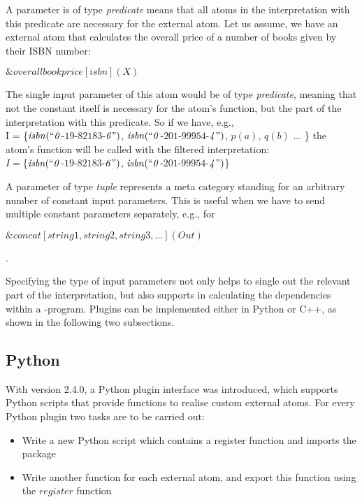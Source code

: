 \documentclass[a4paper, titlepage]{article}
\newcommand{\ext}[3]{\ensuremath{\&{#1}[#2](#3)}}
\newcommand\mycenterline[1]{\par\smallskip\centerline{#1} \smallskip}
\begin{document}
A parameter is of type \emph{predicate} means that 
all atoms in the interpretation with this predicate are 
necessary for the external atom. Let us assume, we have an external 
atom that calculates the overall price of a number of books 
given by their ISBN number:
\mycenterline{$\ext{overallbookprice}{isbn}{X}$}
The single input parameter of this atom would be of type 
\emph{predicate}, meaning that not the constant itself is 
necessary for the atom's function, but the part of the 
interpretation with this predicate. So if we have, e.g.,\\ 
I = \{$\mathit{isbn(``0}$-$\mathit{19}$-$\mathit{82183}$-$\mathit{6")}$, $ \mathit{isbn(``0}$-$\mathit{201}$-$\mathit{99954}$-$\mathit{4")}$, $p(a)$, $q(b)$ $\dots$ \}
the atom's function will be called with the filtered interpretation: \\
$I=$\{$\mathit{isbn(``0}$-$\mathit{19}$-$\mathit{82183}$-$\mathit{6")}$, $ \mathit{isbn(``0}$-$\mathit{201}$-$\mathit{99954}$-$\mathit{4")}$\}

A parameter of type \emph{tuple} represents a meta category standing for an arbitrary number of constant input parameters. This is useful when we have to send multiple constant parameters separately, e.g., for
\mycenterline{$\ext{concat}{string1, string2, string3, \dots}{Out}$}. 

Specifying the type of input parameters not only helps to 
single out the relevant part of the interpretation, but 
also supports \dlvhex{} in calculating the dependencies 
within a \hex-program. Plugins can be implemented either in Python or C++, as shown in the following two subsections.

\subsection{Python}
With \dlvhex{} version 2.4.0, a Python plugin interface was 
introduced, which supports Python scripts that provide 
functions to realise custom external atoms. For every Python plugin two tasks are to be carried out:
\begin{itemize}
\item Write a new Python script which contains a register function and imports the package \dlvhex{}
\item Write another function for each external atom, and export this function using the $\mathit{register}$ function 
\end{itemize}
\end{document}
